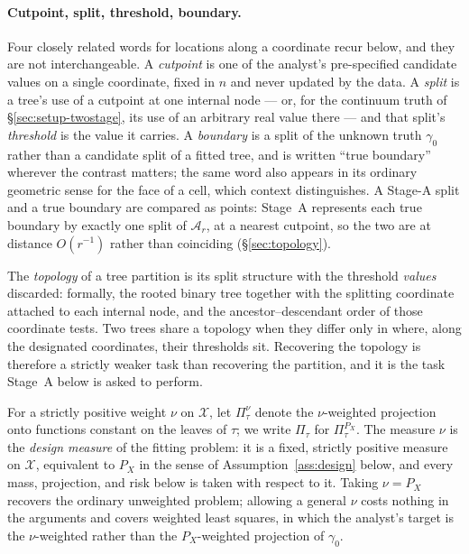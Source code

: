 \documentclass[11pt]{article}
\theoremstyle{plain}
\theoremstyle{definition}
\theoremstyle{remark}
\newcommand{\cX}{\mathcal{X}}
\newcommand{\cA}{\mathcal{A}}
\begin{document}
\paragraph{Cutpoint, split, threshold, boundary.}
Four closely related words for locations along a coordinate recur below, and
they are not interchangeable. A \emph{cutpoint} is one of the analyst's
pre-specified candidate values on a single coordinate, fixed in $n$ and never
updated by the data. A \emph{split} is a tree's use of a cutpoint at one
internal node --- or, for the continuum truth of \S\ref{sec:setup-twostage},
its use of an arbitrary real value there --- and that split's \emph{threshold}
is the value it carries. A \emph{boundary} is a split of the unknown truth
$\gamma_0$ rather than a candidate split of a fitted tree, and is written
``true boundary'' wherever the contrast matters; the same word also appears in
its ordinary geometric sense for the face of a cell, which context
distinguishes. A Stage-A split and a true boundary are compared as points:
Stage~A represents each true boundary by exactly one split of $\cA_r$, at a
nearest cutpoint, so the two are at distance $O(r^{-1})$ rather than
coinciding (\S\ref{sec:topology}).

The \emph{topology} of a tree partition is its split structure with the
threshold \emph{values} discarded: formally, the rooted binary tree together
with the splitting coordinate attached to each internal node, and the
ancestor--descendant order of those coordinate tests. Two trees share a
topology when they differ only in where, along the designated coordinates,
their thresholds sit. Recovering the topology is therefore a strictly weaker
task than recovering the partition, and it is the task Stage~A below is asked
to perform.

For a strictly positive weight $\nu$ on $\cX$, let $\Pi^\nu_\tau$ denote the
$\nu$-weighted projection onto functions constant on the leaves of $\tau$;
we write $\Pi_\tau$ for $\Pi^{P_X}_\tau$. The measure $\nu$ is the
\emph{design measure} of the fitting problem: it is a fixed, strictly
positive measure on $\cX$, equivalent to $P_X$ in the sense of
Assumption~\ref{ass:design} below, and every mass, projection, and risk
below is taken with respect to it. Taking $\nu=P_X$ recovers the ordinary
unweighted problem; allowing a general $\nu$ costs nothing in the arguments
and covers weighted least squares, in which the analyst's target is the
$\nu$-weighted rather than the $P_X$-weighted projection of $\gamma_0$.
\end{document}
